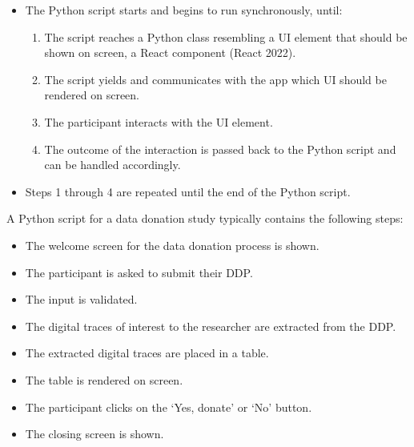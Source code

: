 \documentclass[
]{article}
\providecommand{\tightlist}{%
  \setlength{\itemsep}{0pt}\setlength{\parskip}{0pt}}
\begin{document}
\begin{itemize}
\tightlist
\item
  The Python script starts and begins to run synchronously, until:

  \begin{enumerate}
  \def\labelenumi{\arabic{enumi}.}
  \tightlist
  \item
    The script reaches a Python class resembling a UI element that
    should be shown on screen, a React component (React 2022).
  \item
    The script yields and communicates with the app which UI should be
    rendered on screen.
  \item
    The participant interacts with the UI element.
  \item
    The outcome of the interaction is passed back to the Python script
    and can be handled accordingly.
  \end{enumerate}
\item
  Steps 1 through 4 are repeated until the end of the Python script.
\end{itemize}

A Python script for a data donation study typically contains the
following steps:

\begin{itemize}
\tightlist
\item
  The welcome screen for the data donation process is shown.
\item
  The participant is asked to submit their DDP.
\item
  The input is validated.
\item
  The digital traces of interest to the researcher are extracted from
  the DDP.
\item
  The extracted digital traces are placed in a table.
\item
  The table is rendered on screen.
\item
  The participant clicks on the `Yes, donate' or `No' button.
\item
  The closing screen is shown.
\end{itemize}
\end{document}
